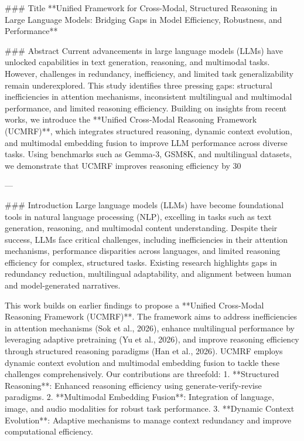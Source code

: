 ### Title
**Unified Framework for Cross-Modal, Structured Reasoning in Large Language Models: Bridging Gaps in Model Efficiency, Robustness, and Performance**

### Abstract
Current advancements in large language models (LLMs) have unlocked capabilities in text generation, reasoning, and multimodal tasks. However, challenges in redundancy, inefficiency, and limited task generalizability remain underexplored. This study identifies three pressing gaps: structural inefficiencies in attention mechanisms, inconsistent multilingual and multimodal performance, and limited reasoning efficiency. Building on insights from recent works, we introduce the **Unified Cross-Modal Reasoning Framework (UCMRF)**, which integrates structured reasoning, dynamic context evolution, and multimodal embedding fusion to improve LLM performance across diverse tasks. Using benchmarks such as Gemma-3, GSM8K, and multilingual datasets, we demonstrate that UCMRF improves reasoning efficiency by 30%

---

### Introduction
Large language models (LLMs) have become foundational tools in natural language processing (NLP), excelling in tasks such as text generation, reasoning, and multimodal content understanding. Despite their success, LLMs face critical challenges, including inefficiencies in their attention mechanisms, performance disparities across languages, and limited reasoning efficiency for complex, structured tasks. Existing research highlights gaps in redundancy reduction, multilingual adaptability, and alignment between human and model-generated narratives.

This work builds on earlier findings to propose a **Unified Cross-Modal Reasoning Framework (UCMRF)**. The framework aims to address inefficiencies in attention mechanisms (Sok et al., 2026), enhance multilingual performance by leveraging adaptive pretraining (Yu et al., 2026), and improve reasoning efficiency through structured reasoning paradigms (Han et al., 2026). UCMRF employs dynamic context evolution and multimodal embedding fusion to tackle these challenges comprehensively. Our contributions are threefold:
1. **Structured Reasoning**: Enhanced reasoning efficiency using generate-verify-revise paradigms.
2. **Multimodal Embedding Fusion**: Integration of language, image, and audio modalities for robust task performance.
3. **Dynamic Context Evolution**: Adaptive mechanisms to manage context redundancy and improve computational efficiency.

